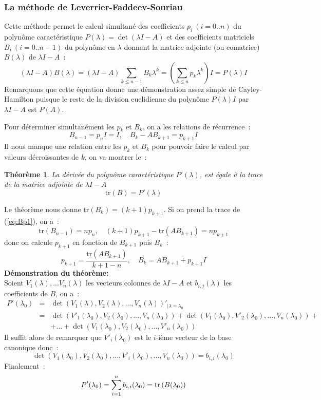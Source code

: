 \documentclass[a4paper,11pt]{article}
\newtheorem{thm}{Théorème}
\newcommand{\tr}{\mbox{tr\,}}
\begin{document}
\subsubsection{La m\'ethode de
  Leverrier-Faddeev-Souriau} 
Cette m\'ethode permet le calcul simultan\'e des coefficients 
$p_i \ (i=0..n)$ du polyn\^ome caract\'eristique 
$P(\lambda)=\det(\lambda I-A)$  et des coefficients matriciels
$B_i \ (i=0..n-1)$ du polyn\^ome en $\lambda$ donnant la matrice adjointe
(ou comatrice) $B(\lambda)$ de $\lambda I -A$~:
\begin{equation} \label{eq:Bp}
 (\lambda I -A)B(\lambda)=(\lambda I -A) \sum_{k\leq n-1} B_k \lambda^k
= (\sum_{k\leq n} p_k \lambda^k)I =P(\lambda)I
\end{equation}
Remarquons que cette équation donne une démonstration assez simple
de Cayley-Hamilton puisque le reste de la division euclidienne
du polynôme $P(\lambda)I$ par $\lambda I -A $ est $P(A)$.

Pour déterminer simultanément les $p_k$ et $B_k$,
on a les relations de récurrence~:
\begin{equation}
\label{eq:Bp1} B_{n-1}=p_n I=I, \quad B_k-AB_{k+1}=p_{k+1} I
\end{equation}
Il nous manque une relation entre les $p_k$ et $B_k$ pour pouvoir
faire le calcul par valeurs décroissantes de $k$, on va montrer le~:
\begin{thm}
La d\'eriv\'ee  du polyn\^ome caract\'eristique $P'(\lambda)$,
est \'egale \`a la trace de la matrice adjointe 
de $\lambda I-A$
\[ \mbox{tr}(B)=P'(\lambda) \]
\end{thm}
Le théorème nous donne $\mbox{tr}(B_k) = (k+1)p_{k+1} $.
Si on prend la trace de (\ref{eq:Bp1}), on a~:
\[ \mbox{tr}(B_{n-1})=n p_n, \quad (k+1)p_{k+1} -\mbox{tr}(AB_{k+1})
=np_{k+1} \]
donc on calcule $p_{k+1}$ en fonction de $B_{k+1}$ puis $B_k$~:
\[ p_{k+1}=\frac{\mbox{tr}(AB_{k+1})}{k+1-n}, 
\quad B_k=AB_{k+1}+p_{k+1} I \]
{\bf D\'emonstration du théorème:}\\
Soient $V_1(\lambda),...V_n(\lambda)$ les vecteurs colonnes 
de $\lambda I-A$ et $b_{i,j}(\lambda)$ les coefficients de $B$, on a~:
\begin{eqnarray*}
P'(\lambda_0) &=& \det(V_1(\lambda),V_2(\lambda),...,V_n(\lambda) )'
_{|\lambda=\lambda_0}\\
&=&\det(V'_1(\lambda_0),V_2(\lambda_0),...,V_n(\lambda_0) )+
\det(V_1(\lambda_0),V'_2(\lambda_0),...,V_n(\lambda_0) )+ \\
& & +...+\det(V_1(\lambda_0),V_2(\lambda_0),...,V'_n(\lambda_0) )
\end{eqnarray*}
Il suffit alors de remarquer que
$V'_i(\lambda_0)$ est le $i$-ième vecteur de la base canonique donc~:
\[ \det(V_1(\lambda_0),V_2(\lambda_0),...,V'_i(\lambda_0),...,V_n(\lambda_0) )
=b_{i,i}(\lambda_0) \]
Finalement~:
\[P'(\lambda_0)=\sum_{i=1}^n b_{i,i}(\lambda_0)=\tr(B(\lambda_0)) \]
\end{document}
